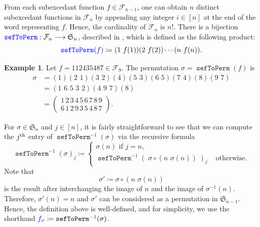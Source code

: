 \documentclass[reqno]{amsart}
\theoremstyle{definition}
\newtheorem{example}[theorem]{Example}
\newcommand{\defin}[1]{%
\relax\ifmmode%
\textcolor{blue}{#1}%
\else\textcolor{blue}{\emph{#1}}%
\fi%
}
\newcommand{\thsup}{\textnormal{th}}
\newcommand{\symS}{\mathfrak{S}}
\newcommand{\SEF}{\mathcal{F}}  %
\DeclareMathOperator{\sefToPerm}{\mathtt{sefToPerm}}
\begin{document}
From each subexcedant function $f \in \SEF_{n-1}$,
one can obtain $n$ distinct subexcedant functions in $\SEF_{n}$ by appending
any integer $i\in [n]$ at the end of the word representing $f$.
Hence, the cardinality of $\mathcal{F}_n$ is $n!$.
There is a bijection $\defin{\sefToPerm}: \SEF_n \longrightarrow \symS_n$,
described in \cite{MantaciRakotondrajao2001}, 
which is defined as the following product:
\begin{equation}\label{eq:sefToPerm}
  \defin{\sefToPerm(f)} \coloneqq (1\,\,f(1)) (2\,\,f(2)) \dotsm (n\,\,f(n)).
\end{equation}

\begin{example}\label{ex:sefToPerm}
Let $f = 112435487 \in \SEF_9$.
The permutation $\sigma=\sefToPerm(f)$ is
 \begin{align*}
 	\sigma &=(1)(2\,\,1)(3\,\,2)(4)(5\,\,3)(6\,\,5)(7\,\,4)(8)(9\,\,7)\\
 	&=(1\,\,6\,\,5\,\,3\,\,2)(4\,\,9\,\,7)(8)\\
 	&=\begin{pmatrix}
 	1\,2\,3\,4\,5\,6\,7\,8\,9 \\ 6\,1\,2\,9\,3\,5\,4\,8\,7
 	\end{pmatrix}.
 \end{align*}
\end{example}




For $\sigma \in \symS_n$ and $j \in [n]$,
it is fairly straightforward to see that we can compute
the $j^\thsup$ entry of $\sefToPerm^{-1}(\sigma)$
via the recursive formula
\begin{equation}\label{eq:permToSefRecursion}
 \sefToPerm^{-1}(\sigma)_j \coloneqq 
\begin{cases}
 \sigma(n) \text{ if $j=n$,} \\
 \sefToPerm^{-1}( \; \sigma \circ (n\,\,\sigma(n)) \;  )_j &\text{ otherwise}.
\end{cases}
\end{equation}
Note that 
\begin{equation}\label{eq:permProjection}
 \sigma' \coloneqq \sigma \circ (n\,\,\sigma(n))
\end{equation}
is the result after interchanging the image of $n$ and the image of $\sigma^{-1}(n)$.
Therefore, $\sigma'(n)= n$ and $\sigma'$ can be considered as a permutation in $\symS_{n-1}$.
Hence, the definition above is well-defined, and for simplicity,
we use the shorthand $\defin{f_\sigma} \coloneqq \sefToPerm^{-1}(\sigma)$.
\end{document}
